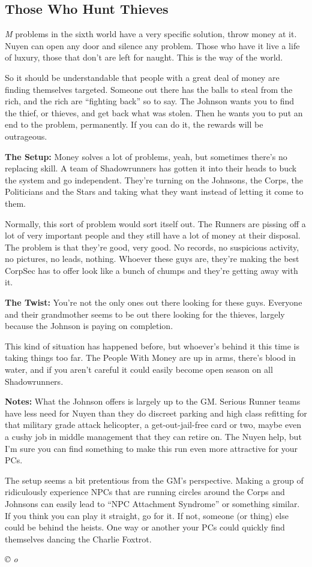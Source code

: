 \documentclass[letterpaper,onecolumn,10pt]{article}
\renewcommand{\textsc}[1]{{\fontspec{Friz Quadrata SC TT}\selectfont #1}}
\newcommand{\getyear}[1]{\StrLeft{#1}{4}}
\newenvironment{scenario}[6]
	{
		\section[#1 {\small\textsc{[#2]}}]{#1} \nopagebreak

		\noindent{\textsc{#2}}\nopagebreak

		\noindent\textit{#3}\nopagebreak
		\def\TMPSCENARIO{{\small\textit{©\getyear{#5}{} #4}}}
	}
	{\TMPSCENARIO}
\newcommand{\synopsis}{\textbf{Synopsis: }}
\newcommand{\notes}{\textbf{Notes: }}
\newcommand{\twist}{\textbf{The Twist: }}
\begin{document}
\begin{multicols}{2}
\begin{scenario}{Those Who Hunt Thieves}
\synopsis 
Most problems in the sixth world have a very specific solution, throw money at it. Nuyen can open any door and silence any problem. Those who have it live a life of luxury, those that don't are left for naught. This is the way of the world.

So it should be understandable that people with a great deal of money are finding themselves targeted. Someone out there has the balls to steal from the rich, and the rich are ``fighting back'' so to say. The Johnson wants you to find the thief, or thieves, and get back what was stolen. Then he wants you to put an end to the problem, permanently. If you can do it, the rewards will be outrageous.

\textbf{The Setup:} Money solves a lot of problems, yeah, but sometimes there's no replacing skill. A team of Shadowrunners has gotten it into their heads to buck the system and go independent. They're turning on the Johnsons, the Corps, the Politicians and the Stars and taking what they want instead of letting it come to them.

Normally, this sort of problem would sort itself out. The Runners are pissing off a lot of very important people and they still have a lot of money at their disposal. The problem is that they're good, very good. No records, no suspicious activity, no pictures, no leads, nothing. Whoever these guys are, they're making the best CorpSec has to offer look like a bunch of chumps and they're getting away with it.

\twist You're not the only ones out there looking for these guys. Everyone and their grandmother seems to be out there looking for the thieves, largely because the Johnson is paying on completion.

This kind of situation has happened before, but whoever's behind it this time is taking things too far. The People With Money are up in arms, there's blood in water, and if you aren't careful it could easily become open season on all Shadowrunners.

\notes
What the Johnson offers is largely up to the GM. Serious Runner teams have less need for Nuyen than they do discreet parking and high class refitting for that military grade attack helicopter, a get-out-jail-free card or two, maybe even a cushy job in middle management that they can retire on. The Nuyen help, but I'm sure you can find something to make this run even more attractive for your PCs.

The setup seems a bit pretentious from the GM's perspective. Making a group of ridiculously experience NPCs that are running circles around the Corps and Johnsons can easily lead to ``NPC Attachment Syndrome'' or something similar. If you think you can play it straight, go for it. If not, someone (or thing) else could be behind the heists. One way or another your PCs could quickly find themselves dancing the Charlie Foxtrot.


\end{scenario}
\end{multicols}
\end{document}
